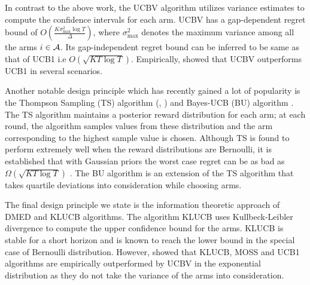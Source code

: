 	In contrast to the above work, the UCBV \citep{audibert2009exploration} algorithm utilizes variance estimates to compute the confidence intervals for each arm. UCBV has a gap-dependent regret bound of $O\left(\frac{K\sigma_{\max}^{2}\log T}{\Delta}\right)$, where $\sigma_{\max}^{2}$ denotes the maximum variance among all the arms $i\in \mathcal{A}$. Its gap-independent regret bound can be inferred to be same as that of UCB1 i.e $O \left(\sqrt{KT\log T}\right)$. Empirically, \citet{audibert2009exploration} showed that UCBV outperforms UCB1 in several scenarios. 
	
	Another notable design principle which has recently gained a lot of popularity is the Thompson Sampling (TS) algorithm (\citep{thompson1933likelihood}, \citep{agrawal2011analysis})  and  Bayes-UCB (BU) algorithm \citep{kaufmann2012bayesian}. %
The TS algorithm maintains a posterior reward distribution for each arm; at each round, the algorithm samples values from these distribution and the arm corresponding to the highest sample value is chosen. Although TS is found to perform extremely well when the reward distributions are Bernoulli, it is established that with Gaussian priors the worst case regret can be as bad as $\Omega \left( \sqrt{KT\log T}\right)$ \citep{lattimore2015optimally}. The BU algorithm is an extension of the TS algorithm that takes quartile deviations into consideration while choosing arms.
	
	The final design principle we state is the information theoretic approach of DMED  \citep{honda2010asymptotically} and KLUCB \citep{garivier2011kl} algorithms. The algorithm KLUCB uses Kullbeck-Leibler divergence to compute the upper confidence bound for the arms. KLUCB is stable for a short horizon and is known to reach the \citet{lai1985asymptotically} lower bound in the special case of Bernoulli distribution. However, \citet{garivier2011kl} showed that KLUCB, MOSS and UCB1 algorithms are  empirically outperformed by UCBV in the exponential distribution as they do not take the variance of the arms into consideration. 